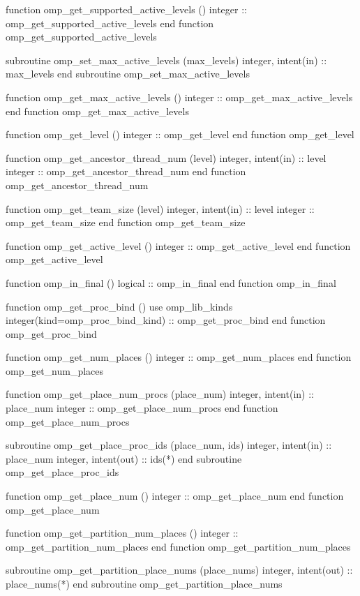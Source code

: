{\begin{ompfFunction}
    function omp_get_supported_active_levels ()
      integer :: omp_get_supported_active_levels
    end function omp_get_supported_active_levels

    subroutine omp_set_max_active_levels (max_levels)
      integer, intent(in) :: max_levels
    end subroutine omp_set_max_active_levels

    function omp_get_max_active_levels ()
      integer :: omp_get_max_active_levels
    end function omp_get_max_active_levels

    function omp_get_level ()
      integer :: omp_get_level
    end function omp_get_level

    function omp_get_ancestor_thread_num (level)
      integer, intent(in) :: level
      integer :: omp_get_ancestor_thread_num
    end function omp_get_ancestor_thread_num

    function omp_get_team_size (level)
      integer, intent(in) :: level
      integer :: omp_get_team_size
    end function omp_get_team_size

    function omp_get_active_level ()
      integer :: omp_get_active_level
    end function omp_get_active_level

    function omp_in_final ()
      logical :: omp_in_final
    end function omp_in_final

    function omp_get_proc_bind ()
      use omp_lib_kinds
      integer(kind=omp_proc_bind_kind) :: omp_get_proc_bind
    end function omp_get_proc_bind

    function omp_get_num_places ()
      integer :: omp_get_num_places
    end function omp_get_num_places

    function omp_get_place_num_procs (place_num)
      integer, intent(in) :: place_num
      integer :: omp_get_place_num_procs
    end function omp_get_place_num_procs

    subroutine omp_get_place_proc_ids (place_num, ids)
      integer, intent(in) :: place_num
      integer, intent(out) :: ids(*)
    end subroutine omp_get_place_proc_ids

    function omp_get_place_num ()
      integer :: omp_get_place_num
    end function omp_get_place_num

    function omp_get_partition_num_places ()
      integer :: omp_get_partition_num_places
    end function omp_get_partition_num_places

    subroutine omp_get_partition_place_nums (place_nums)
      integer, intent(out) :: place_nums(*)
    end subroutine omp_get_partition_place_nums


\end{ompfFunction}}
